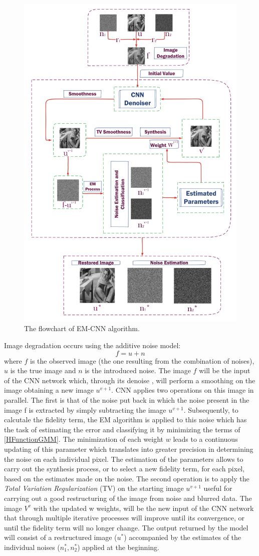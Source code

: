 \begin{figure}[h!]
    \centering
    \includegraphics[width = 0.7 \linewidth]{images/paper7/flowchart.png}
    \centering
    \caption{The flowchart of EM-CNN algorithm.}
    \label{fig:EM-CNN}
\end{figure}
Image degradation occurs using the additive noise model: 
$$ f = u + n $$
where $f$ is the observed image (the one resulting from the combination of 
noises), $u$ is the true image and $n$ is the introduced noise. The image $f$ will 
be the input of the CNN network which, through its denoise \cite{0884882819}, will perform 
a smoothing on the image obtaining a new image $u^{v+1}$. CNN applies two 
operations on this image in parallel. The first is that of the noise put back 
in which the noise present in the image f is extracted by simply subtracting 
the image $u^{v+1}$. Subsequently, to calcutale the fidelity term, the EM algorithm 
\cite{0884882814} is applied to this noise which has the task of estimating the error 
and classifying it by minimizing the terms of \ref{HFunctionGMM}. The minimization of each 
weight $w$ leads to a continuous updating of this parameter which translates 
into greater precision in determining the noise on each individual pixel. The 
estimation of the parameters allows to carry out the synthesis process, or to 
select a new fidelity term, for each pixel, based on the estimates made on the 
noise. The second operation is to apply the \emph{Total Variation Regularization} 
(TV) \cite{0884882802} on the starting image $u^{v+1}$ useful for carrying out a good 
restructuring of the image from noise and blurred data. The image $V^v$ with the 
updated w weights, will be the new input of the CNN network that through 
multiple iterative processes will improve until its convergence, or until the 
fidelity term will no longer change. The output returned by the model will 
consist of a restructured image ($u^*$) accompanied by the estimates of the 
individual noises ($n_1^ *, n_2^*$) applied at the beginning.

